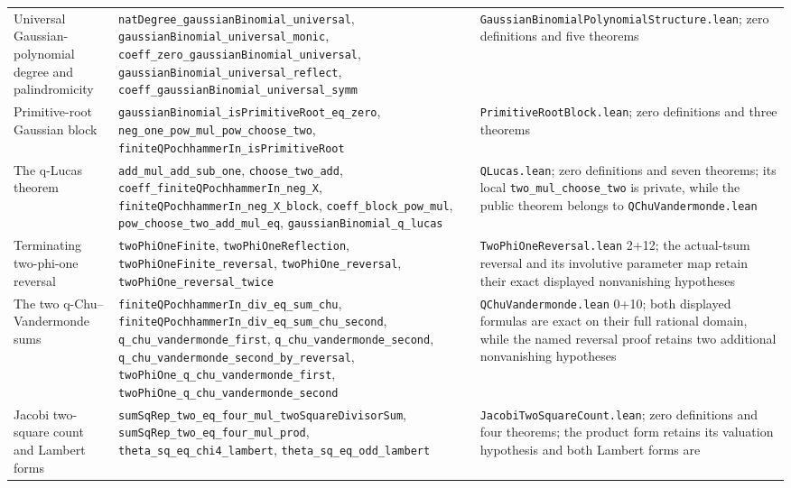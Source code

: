 \documentclass[11pt,oneside]{article}
\theoremstyle{definition}
\theoremstyle{remark}
\begin{document}
\begin{longtable}{@{}p{}p{}p{}@{}}
Universal Gaussian-polynomial degree and palindromicity &
\nolinkurl{natDegree_gaussianBinomial_universal},
\nolinkurl{gaussianBinomial_universal_monic},
\nolinkurl{coeff_zero_gaussianBinomial_universal},
\nolinkurl{gaussianBinomial_universal_reflect},
\nolinkurl{coeff_gaussianBinomial_universal_symm} &
\nolinkurl{GaussianBinomialPolynomialStructure.lean}; zero definitions and five theorems \\
Primitive-root Gaussian block &
\nolinkurl{gaussianBinomial_isPrimitiveRoot_eq_zero},
\nolinkurl{neg_one_pow_mul_pow_choose_two},
\nolinkurl{finiteQPochhammerIn_isPrimitiveRoot} &
\nolinkurl{PrimitiveRootBlock.lean}; zero definitions and three theorems \\
The q-Lucas theorem &
\nolinkurl{add_mul_add_sub_one},
\nolinkurl{choose_two_add}, \nolinkurl{coeff_finiteQPochhammerIn_neg_X},
\nolinkurl{finiteQPochhammerIn_neg_X_block},
\nolinkurl{coeff_block_pow_mul}, \nolinkurl{pow_choose_two_add_mul_eq},
\nolinkurl{gaussianBinomial_q_lucas} &
\nolinkurl{QLucas.lean}; zero definitions and seven theorems; its local
\nolinkurl{two_mul_choose_two} is private, while the public theorem belongs to
\nolinkurl{QChuVandermonde.lean} \\
Terminating two-phi-one reversal &
\nolinkurl{twoPhiOneFinite}, \nolinkurl{twoPhiOneReflection},
\nolinkurl{twoPhiOneFinite_reversal}, \nolinkurl{twoPhiOne_reversal},
\nolinkurl{twoPhiOne_reversal_twice} &
\nolinkurl{TwoPhiOneReversal.lean} 2+12; the actual-tsum reversal and its
involutive parameter map retain their exact displayed nonvanishing hypotheses \\
The two q-Chu--Vandermonde sums &
\nolinkurl{finiteQPochhammerIn_div_eq_sum_chu},
\nolinkurl{finiteQPochhammerIn_div_eq_sum_chu_second},
\nolinkurl{q_chu_vandermonde_first},
\nolinkurl{q_chu_vandermonde_second},
\nolinkurl{q_chu_vandermonde_second_by_reversal},
\nolinkurl{twoPhiOne_q_chu_vandermonde_first},
\nolinkurl{twoPhiOne_q_chu_vandermonde_second} &
\nolinkurl{QChuVandermonde.lean} 0+10; both displayed formulas are exact on
their full rational domain, while the named reversal proof retains two
additional nonvanishing hypotheses \\
Jacobi two-square count and Lambert forms &
\nolinkurl{sumSqRep_two_eq_four_mul_twoSquareDivisorSum},
\nolinkurl{sumSqRep_two_eq_four_mul_prod},
\nolinkurl{theta_sq_eq_chi4_lambert},
\nolinkurl{theta_sq_eq_odd_lambert} &
\nolinkurl{JacobiTwoSquareCount.lean}; zero definitions and four theorems;
the product form retains its valuation hypothesis and both Lambert forms are

\end{longtable}
\end{document}
